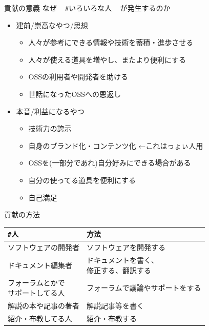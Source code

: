\documentclass[
        unicode%
    ]{beamer}
\newcommand*\hashtag[1]{{\texttt{\#}{#1}}}
\begin{document}
\begin{frame}{貢献の意義}
    なぜ ~ \hashtag{いろいろな人} ~ が発生するのか

    \begin{itemize}
        \pause
        \item 建前/崇高なやつ/思想
            \begin{itemize}
                \item 人々が参考にできる情報や技術を蓄積・進歩させる
                \item 人々が使える道具を増やし、またより便利にする
                \item OSSの利用者や開発者を助ける
                \item 世話になったOSSへの\alert{恩返し}
            \end{itemize}
        \pause
        \item 本音/利益になるやつ
            \begin{itemize}
                \item 技術力の誇示
                \item 自身のブランド化・コンテンツ化 ←これはっょぃ人用
                \item OSSを(一部分であれ)自分好みにできる場合がある
                \item \alert{自分の使ってる道具を便利にする}
                \item 自己満足
            \end{itemize}
    \end{itemize}
\end{frame}

\begin{frame}{貢献の方法}
    \begin{tabular}{l|l} \hline
        \hashtag{人}            & 方法 \\ \hline
        ソフトウェアの開発者    & ソフトウェアを開発する \\ \hline
        ドキュメント編集者      & \shortstack{ドキュメントを書く、\\修正する、\alert{翻訳する}} \\ \hline
        \shortstack{フォーラムとかで\\サポートしてる人}    & フォーラムで議論やサポートをする \\ \hline
        解説の本や記事の著者    & 解説記事等を書く \\ \hline
        紹介・布教してる人      & 紹介・布教する \\ \hline
    \end{tabular}
\end{frame}
\end{document}
